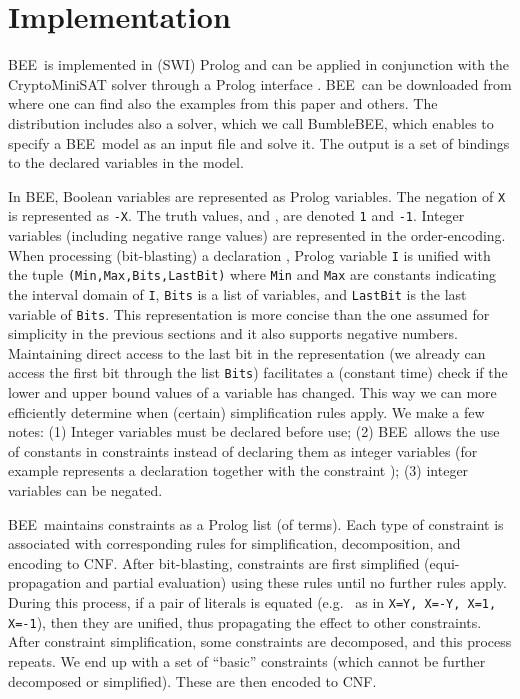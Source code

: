 \documentclass{tlp}
\newcommand{\bee}{\textsf{BEE}}
\begin{document}
\section{Implementation}
\label{sec:implementation}

\bee\ is implemented in (SWI) Prolog and can be applied in conjunction
with the CryptoMiniSAT solver \cite{Crypto} through a Prolog interface
\cite{satPearl}. \bee\ can be downloaded from \cite{bee2012} where one
can find also the examples from this paper and others. The
distribution includes also a solver, which we call Bumble\bee, which
enables to specify a \bee\ model as an input file and solve it. The
output is a set of bindings to the declared variables in the model.

In \bee, Boolean variables are represented as Prolog variables. The
negation of \texttt{X} is represented as \texttt{-X}. The truth
values,  and , are denoted \texttt{1} and \texttt{-1}.
Integer variables (including negative range values) are represented in
the order-encoding. When processing (bit-blasting) a declaration
, Prolog variable \texttt{I} is unified
with the tuple \texttt{(Min,Max,Bits,LastBit)} where \texttt{Min} and
\texttt{Max} are constants indicating the interval domain of
\texttt{I}, \texttt{Bits} is a list of  variables,
and \texttt{LastBit} is the last variable of \texttt{Bits}. This
representation is more concise than the one assumed for simplicity in
the previous sections and it also supports negative
numbers. Maintaining direct access to the last bit in the
representation (we already can access the first bit through the list
\texttt{Bits}) facilitates a (constant time) check if the lower and
upper bound values of a variable has changed. This way we can more
efficiently determine when (certain) simplification rules apply.
We make a few notes: (1) Integer variables must be declared before
use; (2) \bee\ allows the use of constants in constraints instead of
declaring them as integer variables (for example
 represents a declaration
 together with the constraint
); (3) integer variables can be negated.

\bee\ maintains constraints as a Prolog list
(of terms).  Each type of constraint is associated with corresponding
rules for simplification, decomposition, and encoding to CNF.
After bit-blasting, constraints are first simplified (equi-propagation
and partial evaluation) using these rules until no further rules
apply. During this process, if a pair of literals is equated (e.g.~ as
in \texttt{X=Y, X=-Y, X=1, X=-1}), then they are unified, thus
propagating the effect to other constraints. 
After constraint simplification, some constraints are decomposed, and
this process repeats.
We end up with a set of ``basic'' constraints (which cannot be further
decomposed or simplified).  These are then encoded to CNF.
\end{document}
